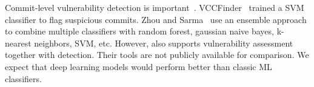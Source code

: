 

\vspace{3pt}
Commit-level vulnerability detection is
important~\cite{perl2015vccfinder,zhou2017automated,chen2019large}.
VCCFinder~\cite{perl2015vccfinder} trained a SVM classifier to flag
suspicious commits. Zhou and Sarma~\cite{zhou2017automated} use an
ensemble approach to combine multiple classifiers with random forest,
gaussian naive bayes, k-nearest neighbors, SVM, etc.
However, {\tool} also supports vulnerability assessment together with
detection. Their tools are not publicly available for comparison. We
expect that deep learning models would perform better than classic ML
classifiers.


